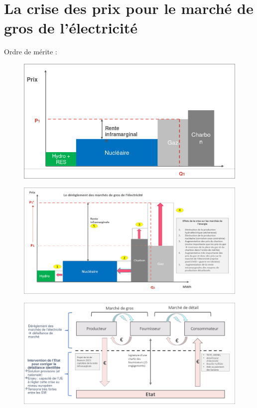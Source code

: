 \section{La crise des prix pour le marché de gros de l'électricité}
Ordre de mérite :
\begin{figure}[hbt!]
    \centering
    \includegraphics[scale=0.5]{Pics/ordre_de_merite.png}
\end{figure}
\begin{figure}[hbt!]
    \centering
    \includegraphics[scale=0.35]{Pics/dereglement_prix_elec.png}
\end{figure}
\newpage
\begin{figure}[hbt!]
    \centering
    \includegraphics[scale=0.3]{Pics/fiscalite_et_surprofits.png}
\end{figure}
